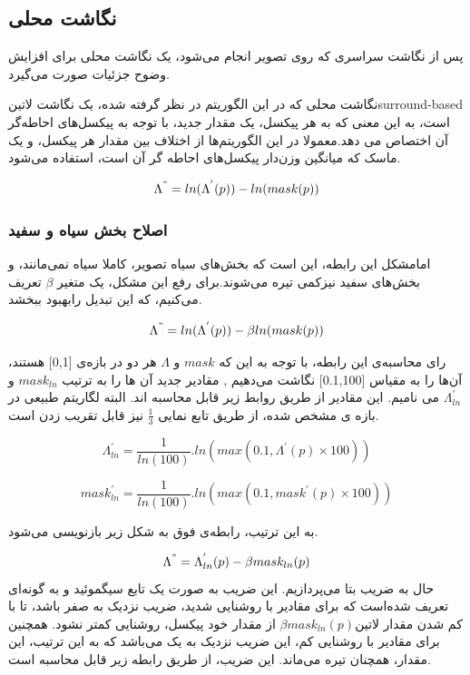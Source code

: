  
\subsection{نگاشت محلی}

پس از نگاشت سراسری که روی تصویر انجام می‌شود، یک نگاشت محلی برای افزایش وضوح جزئیات صورت می‌گیرد.

نگاشت محلی که در این الگوریتم در نظر گرفته شده، یک نگاشت 
‌لاتین{surround-based }
  است، به  این معنی که به هر پیکسل، یک مقدار جدید، با توجه به پیکسل‌های احاطه‌گر آن اختصاص می دهد.معمولا در این الگوریتم‌ها از اختلاف بین مقدار هر پیکسل، و یک ماسک که میانگین وزن‌دار پیکسل‌های احاطه گر آن است، استفاده می‌شود.
  


\begin{equation}
	\Lambda^{"} = ln(\Lambda^{'}(p)) - ln(mask(p))
\end{equation}

\subsubsection{اصلاح بخش سیاه و سفید}
امامشکل این رابطه، این است که بخش‌های سیاه تصویر، کاملا سیاه نمی‌مانند، و بخش‌های سفید نیزکمی تیره می‌شوند.برای رفع این مشکل، یک متغیر $ \beta$ تعریف می‌کنیم، که این تبدیل‌ رابهبود ببخشد.


\begin{equation}
	\Lambda^{"} = ln(\Lambda^{'}(p)) - \beta ln(mask(p))
\end{equation}

رای محاسبه‌ی این رابطه، با توجه به این که $mask$ و $\Lambda$ هر دو در بازه‌‌ی [0,1] هستند، آن‌ها را به مقیاس [0.1,100] نگاشت می‌دهیم , مقادیر جدید آن ها را به ترتیب $mask_{ln}$ و $\Lambda^{'}_{ln}$ می نامیم. این مقادیر از طریق روابط زیر قابل محاسبه اند. البته لگاریتم طبیعی در بازه ی مشخص شده، از طریق تابع نمایی $\frac{1}{3}$ نیز قابل تقریب زدن است.


\begin{equation}
	\Lambda^{'}_{ln} = \frac{1}{ln(100)}.ln(max(0.1, \Lambda^{'}(p)\times 100))
\end{equation}	

\begin{equation}	
	mask^{'}_{ln} = \frac{1}{ln(100)}.ln(max(0.1, mask^{'}(p)\times 100))	
\end{equation}

به این ترتیب، رابطه‌ی فوق به شکل زیر بازنویسی می‌شود.


\begin{equation}
	\Lambda^{"} = \Lambda^{'}_{ln}(p) - \beta mask_{ln}(p)
\end{equation}
حال به ضریب بتا می‌پردازیم.
این ضریب به  صورت یک تابع سیگموئید و به گونه‌ای تعریف شده‌است که برای مقادیر با روشنایی شدید، ضریب نزدیک به صفر باشد، تا با کم شدن مقدار 
‌لاتین{$ \beta mask_{ln}(p) $ }
از مقدار خود پیکسل، روشنایی کمتر نشود. همچنین برای مقادیر با روشنایی کم، این ضریب نزدیک به یک می‌باشد که به این ترتیب، این مقدار، همچنان تیره می‌ماند. این ضریب، از طریق رابطه زیر قابل محاسبه است.


